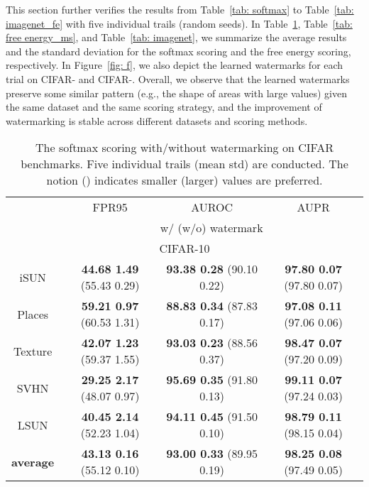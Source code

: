 \documentclass{article}
\begin{document}
This section further verifies the results from Table~\ref{tab: softmax} to Table~\ref{tab: imagenet_fe} with five individual trails (random seeds). In Table~\ref{tab: softmax_ms}, Table~\ref{tab: free energy_ms}, and Table~\ref{tab: imagenet}, we summarize the average results and the standard deviation for the softmax scoring and the free energy scoring, respectively. In Figure~\ref{fig: f}, we also depict the learned watermarks for each trial on CIFAR- and CIFAR-.  Overall, we observe that the learned watermarks preserve some similar pattern (e.g., the shape of areas with large values) given the same dataset and the same scoring strategy, and the improvement of watermarking is stable across different datasets and scoring methods. 

\begin{table}[t]
\centering
\caption{The softmax scoring with/without watermarking on CIFAR benchmarks. Five individual trails (mean  std) are conducted. The notion  () indicates smaller (larger) values are preferred.} \label{tab: softmax_ms}
\vspace{5pt}
\scriptsize
{
\begin{tabular}{c|ccc}
\toprule[1.5pt]
                   & FPR95      & AUROC        & AUPR       \\
                   \cline{2-4} 
\multirow{-2}{*}{} & \multicolumn{3}{c}{w/ (w/o) watermark} \\
\midrule[0.6pt]
\multicolumn{4}{c}{\cellcolor{greyL}CIFAR-10} \\
\midrule[0.6pt]
iSUN               & \textbf{44.68  1.49} (55.43  0.29) & \textbf{93.38  0.28} (90.10  0.22) & \textbf{97.80  0.07} (97.80  0.07) \\ 
Places        & \textbf{59.21  0.97} (60.53  1.31) & \textbf{88.83  0.34} (87.83  0.17) & \textbf{97.08  0.11} (97.06  0.06) \\
Texture            & \textbf{42.07  1.23} (59.37  1.55) & \textbf{93.03  0.23} (88.56  0.37) & \textbf{98.47  0.07} (97.20  0.09) \\
SVHN               & \textbf{29.25  2.17} (48.07  0.97) & \textbf{95.69  0.35} (91.80  0.13) & \textbf{99.11  0.07} (97.24  0.03) \\
LSUN             & \textbf{40.45  2.14} (52.23  1.04) & \textbf{94.11  0.45} (91.50  0.10) & \textbf{98.79  0.11} (98.15  0.04) \\
\midrule
\textbf{average}   & \textbf{43.13  0.16} (55.12  0.10) & \textbf{93.00  0.33} (89.95  0.19) & \textbf{98.25  0.08} (97.49  0.05) \\ \midrule[1pt]

\end{tabular}}
\end{table}
\end{document}
